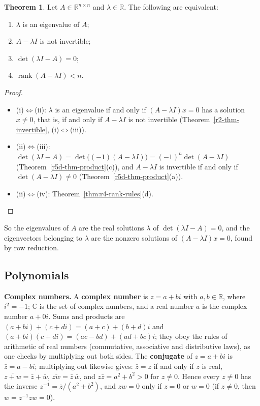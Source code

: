 \documentclass[12pt]{article}
\newcommand{\R}{\mathbb R}
\DeclareMathOperator{\rank}{rank}
\theoremstyle{definition}
\newtheorem{theorem}{Theorem}
\begin{document}
\begin{theorem}\label{r7-thm-eig-singular}
Let \(A\in\R^{n\times n}\) and \(\lambda\in\R\). The following are equivalent:
\begin{enumerate}[label=(\roman*)]
\item \(\lambda\) is an eigenvalue of \(A\);
\item \(A-\lambda I\) is not invertible;
\item \(\det(\lambda I-A)=0\);
\item \(\rank(A-\lambda I)<n\).
\end{enumerate}
\end{theorem}
\begin{proof}
\begin{itemize}
\item (i)\(\Leftrightarrow\)(ii): \(\lambda\) is an eigenvalue if and only if \((A-\lambda I)x=0\) has a solution
\(x\ne0\), that is, if and only if \(A-\lambda I\) is not invertible (Theorem~\ref{r2-thm-invertible},
(i)\(\Leftrightarrow\)(iii)).
\item (ii)\(\Leftrightarrow\)(iii): \(\det(\lambda I-A)=\det\bigl((-1)(A-\lambda I)\bigr)=(-1)^n\det(A-\lambda I)\)
(Theorem~\ref{r5d-thm-product}(c)), and \(A-\lambda I\) is invertible if and only if \(\det(A-\lambda I)\ne0\)
(Theorem~\ref{r5d-thm-product}(a)).
\item (ii)\(\Leftrightarrow\)(iv): Theorem~\ref{thm:r4-rank-rules}(d).\qedhere
\end{itemize}
\end{proof}
So the eigenvalues of \(A\) are the real solutions \(\lambda\) of \(\det(\lambda I-A)=0\), and the eigenvectors
belonging to \(\lambda\) are the nonzero solutions of \((A-\lambda I)x=0\), found by row reduction.

\subsection*{Polynomials}

\textbf{Complex numbers.} A \textbf{complex number} is \(z=a+bi\) with \(a,b\in\R\), where \(i^2=-1\); \(\mathbb C\) is
the set of complex numbers, and a real number \(a\) is the complex number \(a+0i\). Sums and products are
\((a+bi)+(c+di)=(a+c)+(b+d)i\) and \((a+bi)(c+di)=(ac-bd)+(ad+bc)i\); they obey the rules of arithmetic of real
numbers (commutative, associative and distributive laws), as one checks by multiplying out both sides. The
\textbf{conjugate} of \(z=a+bi\) is \(\bar z=a-bi\); multiplying out likewise gives: \(\bar z=z\) if and only if \(z\) is
real, \(\overline{z+w}=\bar z+\bar w\), \(\overline{zw}=\bar z\,\bar w\), and \(z\bar z=a^2+b^2>0\) for \(z\ne0\). Hence every \(z\ne0\) has the inverse \(z^{-1}=\bar z/(a^2+b^2)\), and \(zw=0\)
only if \(z=0\) or \(w=0\) (if \(z\ne0\), then \(w=z^{-1}zw=0\)).
\end{document}
